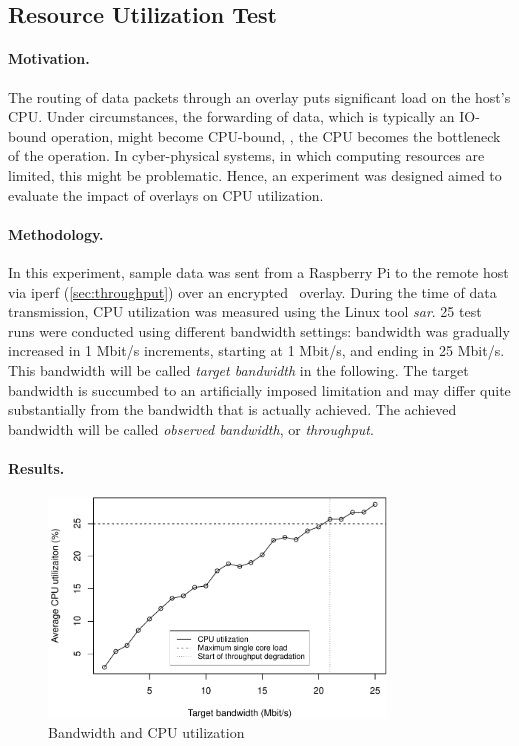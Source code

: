 %
%
%
%
%
%
%
%
%
%


\subsection{Resource Utilization Test} \label{sec:utilization}

\paragraph{Motivation.} The routing of data packets through an overlay puts significant load on the host's CPU. Under circumstances, the forwarding of data, which is typically an IO-bound operation, might become CPU-bound, \ie , the CPU becomes the bottleneck of the operation. In cyber-physical systems, in which computing resources are limited, this might be problematic. Hence, an experiment was designed aimed to evaluate the impact of overlays on CPU utilization.

\paragraph{Methodology.} In this experiment, sample data was sent from a Raspberry Pi to the remote host via iperf (\cf \autoref{sec:throughput}) over an encrypted \wnet\ overlay. During the time of data transmission, CPU utilization was measured using the Linux tool \emph{sar}. 25 test runs were conducted using different bandwidth settings: bandwidth was gradually increased in 1 Mbit/s increments, starting at 1 Mbit/s, and ending in 25 Mbit/s. This bandwidth will be called \emph{target bandwidth} in the following. The target bandwidth is succumbed to an artificially imposed limitation and may differ quite substantially from the bandwidth that is actually achieved. The achieved bandwidth will be called \emph{observed bandwidth}, or \emph{throughput}.

\paragraph{Results.} 

\begin{figure}[htpb]
  \centering
  \includegraphics[width=0.8\textwidth]{figures/cpu}
  \caption[Weave CPU utilization test results]{Bandwidth and CPU utilization}\label{fig:cpu}
\end{figure}

